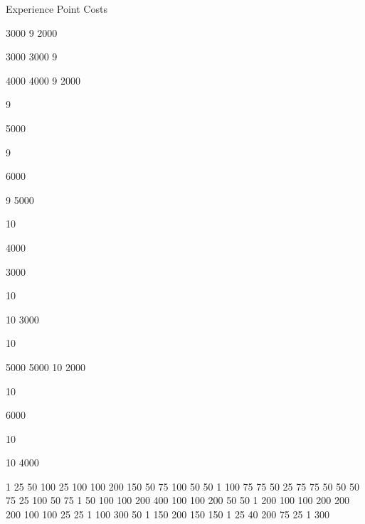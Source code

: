 \begin{Chapter}{Experience Point Costs}
  
  
  
  
  
  
  
  
  
  
  
3000 
9 
2000 
  
  
  
  
  
  
  
3000 
3000 
9 
  
  
  
  
  
  
  
  
4000 
4000 
9 
2000 
  
  
9 
 
 
5000 
 
9 
 
6000 
 
  
 
9 
5000 

10 
  
4000 
  
  
  
  
3000 
  
  
  
  
  
  
10 
  
  
  
  
  
  
  
  
  
  
  
  
  
  
  
10 
3000 
  
  
  
  
  
  
  
  
  
10 
  
  
  
  
  
  
  
  
5000 
5000 
10 
2000 
  
  
10 
 
 
6000 
 
10 
 
 
 
  
 
10 
4000 

1 
25 
50 
100 
25 
100 
100 
200 
150 
50 
75 
100 
50 
50 
1 
100 
75 
75 
50 
25 
75 
75 
50 
50 
50 
75 
25 
100 
50 
75 
1 
50 
100 
100 
200 
400 
100 
100 
200 
50 
50 
1 
200 
100 
100 
200 
200 
200 
100 
100 
25 
25 
1 
100 
300 
50 
1 
150 
200 
150 
150 
1 
25 
40 
200 
75 
25 
1 
300 


\end{Chapter}
